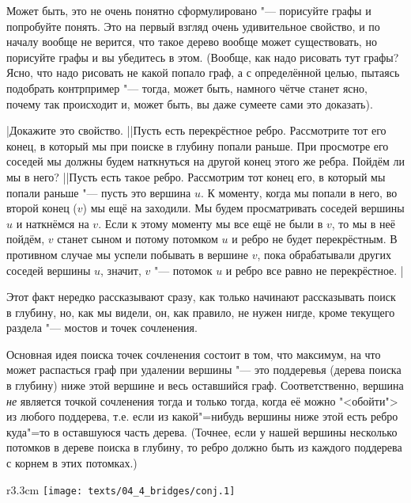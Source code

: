 Может быть, это не очень понятно сформулировано "--- порисуйте графы и попробуйте понять. Это на первый взгляд
очень удивительное свойство, и по началу вообще не верится, что такое дерево вообще может существовать, но 
порисуйте графы и вы убедитесь в этом. (Вообще, как надо рисовать тут графы? Ясно, что надо рисовать не какой 
попало граф, а с определённой целью, пытаясь подобрать контрпример "--- тогда, может быть, намного чётче станет
ясно, почему так происходит и, может быть, вы даже сумеете сами это доказать).

\task|Докажите это свойство.
||Пусть есть перекрёстное ребро. Рассмотрите тот его конец, в который мы при поиске в глубину попали раньше.
При просмотре его соседей мы должны будем наткнуться на другой конец этого же ребра. Пойдём ли мы в него?
||Пусть есть такое ребро. Рассмотрим тот конец его, в который мы попали раньше "--- пусть это
вершина $u$. К моменту, когда мы попали в него, во второй конец ($v$) мы ещё на заходили. Мы будем
просматривать соседей вершины $u$ и наткнёмся на $v$. Если к этому моменту мы все ещё не были в $v$,
то мы в неё пойдём, $v$ станет сыном и потому потомком $u$ и ребро не будет перекрёстным. В противном случае 
мы успели побывать в вершине $v$, пока обрабатывали других соседей вершины $u$, значит, $v$ "--- потомок $u$
и ребро все равно не перекрёстное.
|\label{crossedges}

Этот факт нередко рассказывают сразу, как только начинают рассказывать поиск в глубину, но, как мы видели,
он, как правило, не нужен нигде, кроме текущего раздела "--- мостов и точек сочленения. 

Основная идея поиска точек сочленения состоит в том, что максимум, на что может распасться
граф при удалении вершины "--- это поддеревья (дерева поиска в глубину) ниже этой вершине и весь оставшийся граф.
Соответственно, вершина \textit{не} является точкой сочленения тогда и только тогда, когда её можно "<обойти">
из любого поддерева, т.е. если из какой"=нибудь вершины ниже этой есть ребро куда"=то в оставшуюся часть дерева.
(Точнее, если у нашей вершины несколько потомков в дереве поиска в глубину, то ребро должно быть
из каждого поддерева с корнем в этих потомках.) 

\begin{wrapfigure}{r}{3.3cm}
\texttt{[image: texts/04\_4\_bridges/conj.1]}
\end{wrapfigure}

